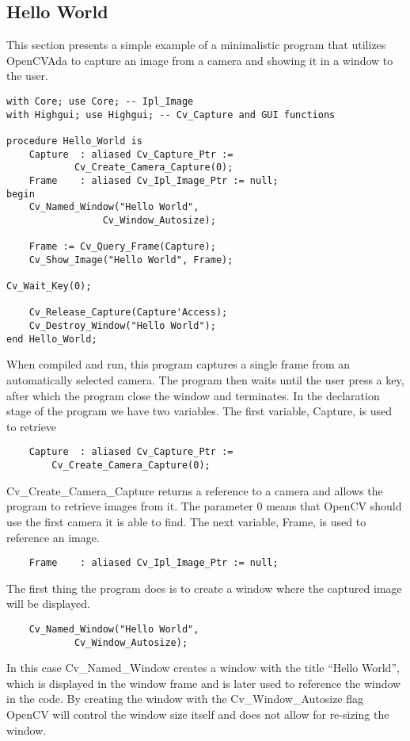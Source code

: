\subsection{Hello World}
This section presents a simple example of a minimalistic program that utilizes OpenCVAda to capture an image from a camera and showing it in a window to the user. 
\begin{lstlisting}
with Core; use Core; -- Ipl_Image
with Highgui; use Highgui; -- Cv_Capture and GUI functions

procedure Hello_World is
	Capture  : aliased Cv_Capture_Ptr := 
			Cv_Create_Camera_Capture(0);
	Frame    : aliased Cv_Ipl_Image_Ptr := null;
begin
	Cv_Named_Window("Hello World", 
		         Cv_Window_Autosize);

	Frame := Cv_Query_Frame(Capture);
	Cv_Show_Image("Hello World", Frame);

Cv_Wait_Key(0);
		
	Cv_Release_Capture(Capture'Access);
	Cv_Destroy_Window("Hello World");
end Hello_World;
\end{lstlisting}
When compiled and run, this program captures a single frame from an automatically selected camera. The program then waits until the user press a key, after which the program close the window and terminates.
In the declaration stage of the program we have two variables. The first variable, Capture, is used to retrieve
\begin{lstlisting}
	Capture  : aliased Cv_Capture_Ptr := 
		Cv_Create_Camera_Capture(0);
\end{lstlisting} 
Cv_Create_Camera_Capture returns a reference to a camera and allows the program to retrieve images from it. The parameter 0 means that OpenCV should use the first camera it is able to find.
The next variable, Frame, is used to reference an image.
\begin{lstlisting}
	Frame    : aliased Cv_Ipl_Image_Ptr := null;
\end{lstlisting}
The first thing the program does is to create a window where the captured image will be displayed.
\begin{lstlisting}
	Cv_Named_Window("Hello World", 
			Cv_Window_Autosize);
\end{lstlisting}
In this case Cv_Named_Window creates a window with the title “Hello World”, which is displayed in the window frame and is later used to reference the window in the code. By creating the window with the Cv_Window_Autosize flag OpenCV will control the window size itself and does not allow for re-sizing the window.
